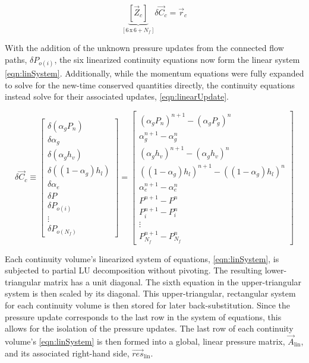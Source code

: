 \begin{equation}
\label{eqn:linSystem}
\underbrace{\left[\vec{Z}_{c}\right]}_{\left[6\, \text{x}\, 6 + N_{f}\right]} \delta \vec{C}_{c} = \vec{r}_{c}
\end{equation}

With the addition of the unknown pressure updates from the connected flow paths, $\delta P_{o(i)}$,  the six linearized continuity equations now form the linear system \eqref{eqn:linSystem}.
Additionally, while the momentum equations were fully expanded to solve for the new-time conserved quantities directly, the continuity equations instead solve for their associated updates, \eqref{eqn:linearUpdate}.

\begin{equation}
\label{eqn:linearUpdate}
\delta \vec{C}_{c} \equiv 
\begin{bmatrix}
\delta ( \alpha_{g} P_{n} ) \\
\delta \alpha_{g} \\
\delta ( \alpha_{g} h_v ) \\
\delta ( (1 - \alpha_{g} ) h_l ) \\
\delta \alpha_{e} \\
\delta P \\ 
\delta P_{o(i)} \\
\vdots \\
\delta P_{o(N_{f})}
\end{bmatrix}
=
\begin{bmatrix}
( \alpha_{g} P_{n})^{n+1} - (\alpha_{g} P_{g} )^{n} \\
\alpha^{n+1}_{g} - \alpha^{n}_{g} \\
( \alpha_{g} h_{v} )^{n+1} - ( \alpha_{g} h_{v} )^{n} \\
( ( 1 - \alpha_{g} ) h_{l} )^{n+1} - ( ( 1 - \alpha_{g} ) h_{l} )^{n} \\
\alpha^{n+1}_{e} - \alpha^{n}_{e} \\
 P^{n+1} - P^{n} \\
 P_{i}^{n+1} - P_{i}^{n} \\
 \vdots \\
 P_{N_{f}}^{n+1} - P_{N_{f}}^{n}
\end{bmatrix}
\end{equation}

Each continuity volume's linearized system of equations, \eqref{eqn:linSystem}, is subjected to partial LU decomposition without pivoting.
The resulting lower-triangular matrix has a unit diagonal.
The sixth equation in the upper-triangular system is then scaled by its diagonal.
This upper-triangular, rectangular system for each continuity volume is then stored for later back-substitution.
Since the pressure update corresponds to the last row in the system of equations, this allows for the isolation of the pressure updates.
The last row of each continuity volume's \eqref{eqn:linSystem} is then formed into a global, linear pressure matrix, $\vec{A}_{\text{lin}}$, and its associated right-hand side, $\vec{res}_{\text{lin}}$.

